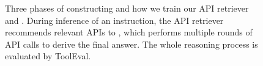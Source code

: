 \begin{figure}[!t]
    \centering
    \caption{
    \small{Three phases of constructing \ourdata and how we train our API retriever and \ourmodel. During inference of an instruction, the API retriever recommends relevant APIs to \ourmodel, which performs multiple rounds of API calls to derive the final answer. The whole reasoning process is evaluated by ToolEval.
    }
    }
    \label{fig:overview}
\end{figure}

